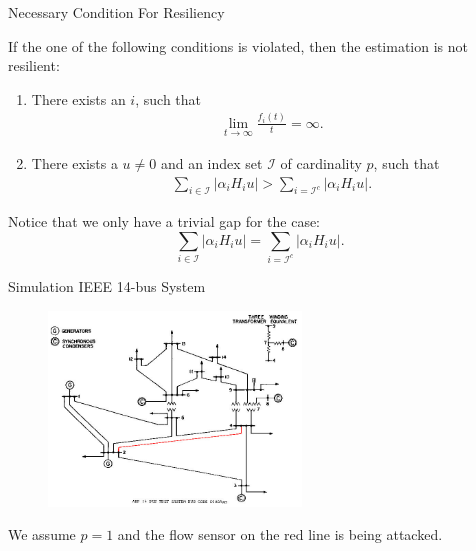 \documentclass{beamer}
\begin{document}
\begin{frame}{Necessary Condition For Resiliency}
  \begin{theorem}
    If the one of the following conditions is violated, then the estimation is not resilient:
    \begin{enumerate}
    \item There exists an $i$, such that
      \begin{align*}
        \lim_{t\rightarrow\infty}\frac{f_i(t)}{t} = \infty.
      \end{align*}
    \item There exists a $u\neq 0$ and an index set $\mathcal I$ of cardinality $p$, such that
      \begin{align*}
        \sum_{i\in \mathcal I} |\alpha_i H_i u| > \sum_{i=\mathcal I^c} |\alpha_i H_i u|.
      \end{align*}
    \end{enumerate}
  \end{theorem}
  Notice that we only have a trivial gap for the case:
  \[ \sum_{i\in \mathcal I} |\alpha_i H_i u| = \sum_{i=\mathcal I^c} |\alpha_i H_i u|.\]
\end{frame}

\begin{frame}{Simulation IEEE 14-bus System}
  \begin{figure}[ht]
    \centering
    \includegraphics[width=0.60\textwidth]{ieee14.jpg}
  \end{figure}
  We assume $p=1$ and the flow sensor on the red line is being attacked.
\end{frame}
\end{document}
